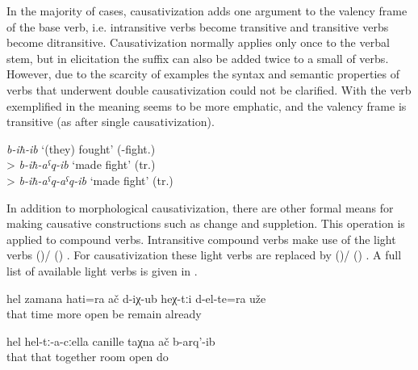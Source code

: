 In the majority of cases, causativization adds one argument to the valency frame of the base verb, i.e. intransitive verbs become transitive and transitive verbs become ditransitive.
Causativization normally applies only once to the verbal stem, but in elicitation the  suffix can also be added twice to a small  of verbs. However, due to the scarcity of examples the syntax and semantic properties of verbs that underwent double causativization could not be clarified. With the verb exemplified in  the meaning seems to be more emphatic, and the valency frame is transitive (as after single causativization). 

\begin{exe} 
	\ex	\label{ex:causativizedVerbFight} 
	\textit{b-iħ-ib} `(they) fought' (-fight.) \\
	> \textit{b-iħ-aˁq-ib} `made fight' (tr.) \\
	> \textit{b-iħ-aˁq-aˁq-ib} `made fight' (tr.)
\end{exe}


In addition to morphological causativization, there are other formal means for making causative constructions such as  change and suppletion. This operation is applied to compound verbs. Intransitive compound verbs make use of the light verbs  ()\slash{} ()  . For causativization these light verbs are replaced by  ()\slash{} ()  . A full list of available light verbs is given in .  


\begin{exe}
	\ex	\label{ex:‎At that time they (the trousers) opened even more}
	\gll	hel	zamana	hati=ra	ač	d-iχ-ub	heχ-tːi	d-el-te=ra	uže\\
		that	time	more	open	be		remain	already\\
	\glt	{}

	\ex	\label{ex:‎He opened the room together with them}
	\gll	hel	hel-tː-a-cːella	canille	taχna	ač	b-arq'-ib\\
		that	that	together	room	open	do\\
	\glt	{}
\end{exe}

